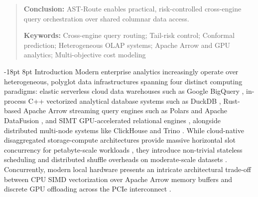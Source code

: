\documentclass[10pt,a4paper]{article}
\makeatletter
\renewcommand\section{\@startsection{section}{1}{\z@}%
  {-18pt \@plus -4pt \@minus -2pt}%
  {8pt \@plus 2pt}%
  {\normalfont\large\bfseries}}
\makeatother
\begin{document}
\begin{quote}
\textbf{Conclusion:} AST-Route enables practical, risk-controlled cross-engine query orchestration over shared columnar data access.

\noindent\textbf{Keywords:} Cross-engine query routing; Tail-risk control; Conformal prediction; Heterogeneous OLAP systems; Apache Arrow and GPU analytics; Multi-objective cost modeling
\end{quote}

\section{Introduction}
Modern enterprise analytics increasingly operate over heterogeneous, polyglot data infrastructures spanning four distinct computing paradigms: elastic serverless cloud data warehouses such as Google BigQuery \cite{melnik2010dremel, melnik2020dremel, lounissi2025funda}, in-process C++ vectorized analytical database systems such as DuckDB \cite{raasveldt2019duckdb, kuiper2024duckdb_ooc}, Rust-based Apache Arrow streaming query engines such as Polars and Apache DataFusion \cite{lamb2024datafusion}, and SIMT GPU-accelerated relational engines \cite{chrysogelos2019hetexchange, shanbhag2020crystal, bress2013hype}, alongside distributed multi-node systems like ClickHouse \cite{schulze2024clickhouse} and Trino \cite{sethi2019presto}. While cloud-native disaggregated storage-compute architectures provide massive horizontal slot concurrency for petabyte-scale workloads \cite{shojaee2024serverless, abdalla2022bigdata}, they introduce non-trivial stateless scheduling and distributed shuffle overheads on moderate-scale datasets \cite{begoli2018calcite, garcia2008database, lounissi2025funda}. Concurrently, modern local hardware presents an intricate architectural trade-off between CPU SIMD vectorization over Apache Arrow memory buffers and discrete GPU offloading across the PCIe interconnect \cite{milicevic2024dlquery, root2019mapd, kim2022blazingsql}.
\end{document}
